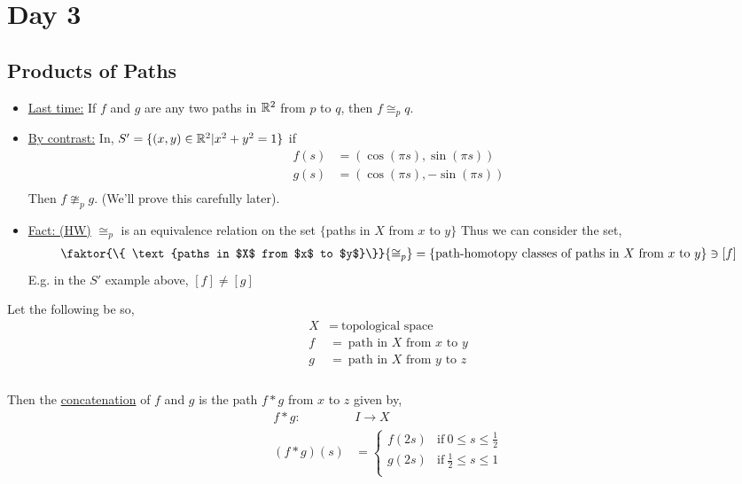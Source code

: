 \section{Day 3}
    \subsection{Products of Paths}
    \begin{itemize}
        \item \underline{Last time:} If $f$ and $g$ are any two paths in $\mathbb{R}^2$ from $p$ to $q$, then $f\cong_{p}q$.
        \item \underline{By contrast:} In, $S'=\{(x,y)\in \mathbb{R}^2| x^2+y^2=1\}$ if
            \begin{align*}
                f(s)&=(\cos(\pi s), \sin(\pi s))\\
                g(s)&=(\cos(\pi s), -\sin(\pi s))\\
            \end{align*}
            Then $f\ncong_{p}g$. (We'll prove this carefully later).
        \item \underline{Fact: (HW)} $\cong_{p}$ is an equivalence relation on the set $\{$paths in $X$ from $x$ to $y\}$
            Thus we can consider the set,
            \begin{align*}
                \faktor{\{ \text{paths in $X$ from $x$ to $y$}\}}{\cong_{p}}
                =\{\text{path-homotopy classes of paths in $X$ from $x$ to $y$}\}\ni [f]\\
            \end{align*}
            E.g. in the $S'$ example above, $[f]\neq[g]$
    \end{itemize}
        \begin{definition} Let the following be so,
            \begin{align*}
                X &=\ \text{topological space}\\
                f &=\ \text{path in $X$ from $x$ to $y$}\\
                g &=\ \text{path in $X$ from $y$ to $z$}\\
            \end{align*}\\
            Then the \underline{concatenation} of $f$ and $g$ is the path $f*g$ from $x$ to $z$ given by,
            \begin{align*}
                f*g:\ &I \rightarrow X\\
                (f*g)(s)&=\begin{cases}
                    f(2s) & \text{if}\ 0\leq s \leq \frac{1}{2}\\
                    g(2s) & \text{if}\ \frac{1}{2}\leq s \leq 1\\
                \end{cases}\\
            \end{align*}
        \end{definition}
